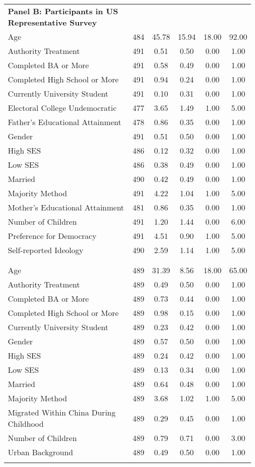 \documentclass[]{article}
\begin{document}
\begin{adjustbox}{width=\columnwidth, totalheight=9.2in, center}
\begin{tabular}{lccccc}
\multirow{2}{5.5cm}{\textbf{Panel B: Participants in US Representative Survey}} &&&&&
\\  \\ \hline
Age & 484 & 45.78 & 15.94 & 18.00 & 92.00\\
Authority Treatment & 491 & 0.51 & 0.50 & 0.00 & 1.00\\
Completed BA or More & 491 & 0.58 & 0.49 & 0.00 & 1.00\\
Completed High School or More & 491 & 0.94 & 0.24 & 0.00 & 1.00\\
Currently University Student & 491 & 0.10 & 0.31 & 0.00 & 1.00\\
Electoral College Undemocratic & 477 & 3.65 & 1.49 & 1.00 & 5.00\\
Father’s Educational Attainment & 478 & 0.86 & 0.35 & 0.00 & 1.00\\
Gender & 491 & 0.51 & 0.50 & 0.00 & 1.00\\
High SES & 486 & 0.12 & 0.32 & 0.00 & 1.00\\
Low SES & 486 & 0.38 & 0.49 & 0.00 & 1.00\\
Married & 490 & 0.42 & 0.49 & 0.00 & 1.00\\
Majority Method & 491 & 4.22 & 1.04 & 1.00 & 5.00\\
Mother’s Educational Attainment & 481 & 0.86 & 0.35 & 0.00 & 1.00\\
Number of Children & 491 & 1.20 & 1.44 & 0.00 & 6.00\\
Preference for Democracy & 491 & 4.51 & 0.90 & 1.00 & 5.00\\
Self-reported Ideology & 490 & 2.59 & 1.14 & 1.00 & 5.00\\
\noalign{\smallskip}\hline
\multirow{2}{5.5cm}{\textbf{Panel C: Participants in Mainland China}} &&&&&
\\  \\ \hline
Age & 489 & 31.39 & 8.56 & 18.00 & 65.00\\
Authority Treatment & 489 & 0.49 & 0.50 & 0.00 & 1.00\\
Completed BA or More & 489 & 0.73 & 0.44 & 0.00 & 1.00\\
Completed High School or More & 489 & 0.98 & 0.15 & 0.00 & 1.00\\
Currently University Student & 489 & 0.23 & 0.42 & 0.00 & 1.00\\
Gender & 489 & 0.57 & 0.50 & 0.00 & 1.00\\
High SES & 489 & 0.24 & 0.42 & 0.00 & 1.00\\
Low SES & 489 & 0.13 & 0.34 & 0.00 & 1.00\\
Married & 489 & 0.64 & 0.48 & 0.00 & 1.00\\
Majority Method & 489 & 3.68 & 1.02 & 1.00 & 5.00\\
Migrated Within China During Childhood & 489 & 0.29 & 0.45 & 0.00 & 1.00\\
Number of Children & 489 & 0.79 & 0.71 & 0.00 & 3.00\\
Urban Background & 489 & 0.49 & 0.50 & 0.00 & 1.00\\
\noalign{\smallskip}\hline
\end{tabular} \\
\end{adjustbox}
\end{document}
